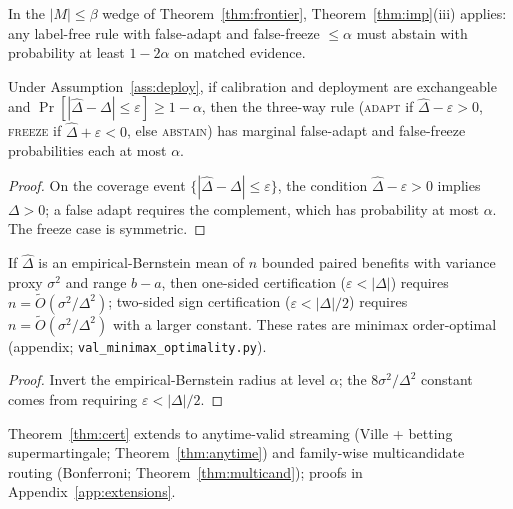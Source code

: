 \begin{corollary}\label{cor:forced-abstain}
In the $|M|\le\beta$ wedge of Theorem~\ref{thm:frontier}, Theorem~\ref{thm:imp}(iii) applies:
any label-free rule with false-adapt and false-freeze $\le\alpha$ must abstain with probability at
least $1-2\alpha$ on matched evidence.
\end{corollary}

\begin{theorem}\label{thm:cert}\label{thm:certificate}
Under Assumption~\ref{ass:deploy}, if calibration and deployment are exchangeable and
$\Pr[|\widehat\Delta-\Delta|\le\varepsilon]\ge1-\alpha$, then the three-way rule
(\textsc{adapt} if $\widehat\Delta-\varepsilon>0$, \textsc{freeze} if
$\widehat\Delta+\varepsilon<0$, else \textsc{abstain}) has marginal false-adapt and
false-freeze probabilities each at most $\alpha$.
\end{theorem}
\begin{proof}
On the coverage event $\{|\widehat\Delta-\Delta|\le\varepsilon\}$, the condition
$\widehat\Delta-\varepsilon>0$ implies $\Delta>0$; a false adapt requires the complement,
which has probability at most $\alpha$. The freeze case is symmetric.
\end{proof}

\begin{proposition}\label{prop:cert-sample}
If $\widehat\Delta$ is an empirical-Bernstein mean of $n$ bounded paired benefits with variance
proxy $\sigma^2$ and range $b-a$, then one-sided certification ($\varepsilon<|\Delta|$) requires
$n=\tilde O(\sigma^2/\Delta^2)$; two-sided sign certification ($\varepsilon<|\Delta|/2$) requires
$n=\tilde O(\sigma^2/\Delta^2)$ with a larger constant. These rates are minimax order-optimal
(appendix; \texttt{val\_minimax\_optimality.py}).
\end{proposition}
\begin{proof}
Invert the empirical-Bernstein radius at level $\alpha$; the $8\sigma^2/\Delta^2$ constant
comes from requiring $\varepsilon<|\Delta|/2$.
\end{proof}

\begin{remark}\label{rem:cert-ext}
Theorem~\ref{thm:cert} extends to anytime-valid streaming (Ville + betting supermartingale;
Theorem~\ref{thm:anytime}) and family-wise multicandidate routing (Bonferroni;
Theorem~\ref{thm:multicand}); proofs in Appendix~\ref{app:extensions}.
\end{remark}

